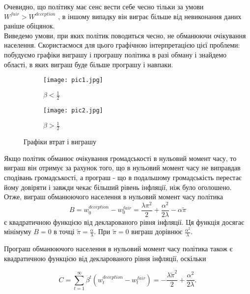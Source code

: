 Очевидно, що політику має сенс вести себе чесно тільки за умови $W^{fair} > W^{deception}$ , в іншому випадку він виграє більше від невиконання даних раніше обіцянок.
\\

Виведемо умови, при яких політик поводиться чесно, не обманюючи очікування населення. Скористаємося для цього графічною інтерпретацією цієї проблеми: побудуємо графіки виграшу і програшу політика в разі обману і знайдемо області, в яких виграш буде більше програшу і навпаки.

\begin{figure}[h]
	
	\begin{subfigure}{0.5\textwidth}
		\texttt{[image: pic1.jpg]} 
		\caption{$\beta < \frac{1}{2}$}
		\label{fig:pic1}
	\end{subfigure}
	\begin{subfigure}{0.5\textwidth}
		\texttt{[image: pic2.jpg]}
		\caption{$\beta > \frac{1}{2}$}
		\label{fig:pic2}
	\end{subfigure}
	
	\caption{Графіки втрат і виграшу}
	\label{fig:image2}
\end{figure}

Якщо політик обманює очікування громадськості в нульовий момент часу, то виграш він отримує за рахунок того, що в нульовий момент часу не виправдав сподівань громадськості, а програш - що в подальшому громадськість перестає йому довіряти і завжди чекає більший рівень інфляції, ніж було оголошено.
\\

Отже, виграш обманюючого населення в нульовий момент часу політика
\begin{equation}
B=w^{deception}_0 - w^{fair}_0 = \frac{\lambda\pi^2}{2}+\frac{\alpha^2}{2\lambda}-\alpha\tilde{\pi}
\end{equation}
є квадратичною функцією від декларованого рівня інфляції. Ця функція досягає мінімуму $ B = 0 $ в точці $\tilde{\pi}=\frac{\alpha}{\lambda}$. При $\tilde{\pi}=0$  виграш дорівнює $\frac{\alpha^2}{\lambda}$.

Програш обманюючого населення в нульовий момент часу політика також є квадратичною функцією від декларованого рівня інфляції, оскільки

\begin{equation}
	\label{eq:sec:domain:main4}
C=\sum_{t=1}^{\infty} \beta^t(w^{deception}_t - w^{fair}_t) = -\frac{\lambda\tilde{\pi}^2}{2}+\frac{\alpha^2}{2\lambda}.
\end{equation}



